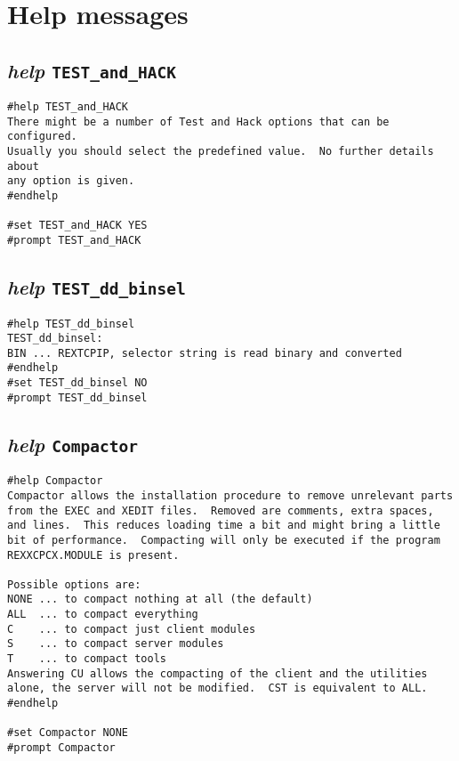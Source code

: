 \section{Help messages}

\def\LPtopC{Help messages}

\def\LPtopD{~}

\def\LPtopF{~}

\subsection{{\sl{help}} {\tt TEST\_and\_HACK}}

\def\LPtopD{{\sl{help}} {\tt TEST\_and\_HACK}}

\def\LPtopF{~}

\begin{verbatim}
#help TEST_and_HACK
There might be a number of Test and Hack options that can be configured.
Usually you should select the predefined value.  No further details about
any option is given.
#endhelp

#set TEST_and_HACK YES
#prompt TEST_and_HACK
\end{verbatim}

\subsection{{\sl{help}} {\tt TEST\_dd\_binsel}}

\def\LPtopD{{\sl{help}} {\tt TEST\_dd\_binsel}}

\def\LPtopF{~}

\begin{verbatim}
#help TEST_dd_binsel
TEST_dd_binsel:
BIN ... REXTCPIP, selector string is read binary and converted
#endhelp
#set TEST_dd_binsel NO
#prompt TEST_dd_binsel
\end{verbatim}

\subsection{{\sl{help}} {\tt Compactor}}

\def\LPtopD{{\sl{help}} {\tt Compactor}}

\def\LPtopF{~}

\begin{verbatim}
#help Compactor
Compactor allows the installation procedure to remove unrelevant parts
from the EXEC and XEDIT files.  Removed are comments, extra spaces,
and lines.  This reduces loading time a bit and might bring a little
bit of performance.  Compacting will only be executed if the program
REXXCPCX.MODULE is present.

Possible options are:
NONE ... to compact nothing at all (the default)
ALL  ... to compact everything
C    ... to compact just client modules
S    ... to compact server modules
T    ... to compact tools
Answering CU allows the compacting of the client and the utilities
alone, the server will not be modified.  CST is equivalent to ALL.
#endhelp

#set Compactor NONE
#prompt Compactor
\end{verbatim}


